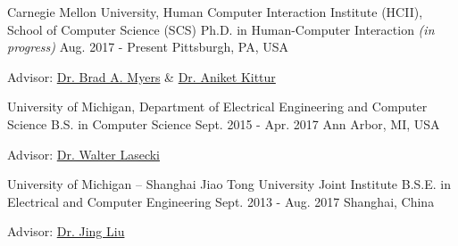 

\begin{cventries}

  \cventry
    {Carnegie Mellon University, Human Computer Interaction Institute (HCII), School of Computer Science (SCS)} %
    {Ph.D. in Human-Computer Interaction \bodyfontlight\mdseries\textit{(in progress)}} %
    {Aug. 2017 - Present} %
    {Pittsburgh, PA, USA} %
    {
      \begin{cvitems} %
        \item {Advisor: \href{http://www.cs.cmu.edu/~bam/}{Dr. Brad A. Myers} \& \href{http://kittur.org/}{Dr. Aniket Kittur}}
      \end{cvitems}
    }
  
  \cventry
    {University of Michigan, Department of Electrical Engineering and Computer Science} %
    {B.S. in Computer Science} %
    {Sept. 2015 - Apr. 2017} %
    {Ann Arbor, MI, USA} %
    {
      \begin{cvitems} %
        \item {Advisor: \href{http://wslasecki.com/}{Dr. Walter Lasecki}}
      \end{cvitems}
    }
  
  \cventry
    {University of Michigan – Shanghai Jiao Tong University Joint Institute} %
    {B.S.E. in Electrical and Computer Engineering} %
    {Sept. 2013 - Aug. 2017} %
    {Shanghai, China} %
    {
      \begin{cvitems} %
        \item {Advisor: \href{http://umji.sjtu.edu.cn/faculty/jing-liu/}{Dr. Jing Liu}}
      \end{cvitems}
    }

\end{cventries}
